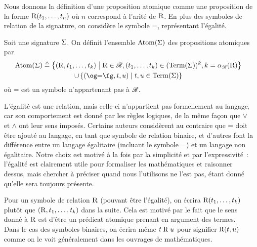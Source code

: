 Nous donnons la définition d'une proposition atomique comme une proposition de
la forme $\mathrm{R}(t_1,\ldots,t_n)$ où $n$ correspond à l'arité de $\mathrm{R}$. En
plus des symboles de relation de la signature, on considère le symbole
$\mathord{=}$, représentant l'égalité.

\begin{definition}
  Soit une signature $\Sigma$. On définit l'ensemble $\operatorname{Atom}(\Sigma)$ des
  propositions atomiques par
  \begin{multline*}
    \Atom(\Sign) \defeq \compr{(\symbR,t_1,\ldots,t_k)}{\symbR\in\SigRel,
    (t_1,\ldots,t_k) \in (\Term(\Sign))^k, k = \aritRel(\symbR)}\\
    \cup\compr{(\ogM\mathord{=}\fgM,t,u)}{t,u\in \Term(\Sign)}
  \end{multline*}
  où $\mathord{=}$ est un symbole n'appartenant pas à $\mathscr R$.
\end{definition}

\begin{remark}
  L'égalité est une relation, mais celle-ci n'appartient pas formellement au
  langage, car son comportement est donné par les règles logiques, de la même
  façon que $\lor$ et $\land$ ont leur sens imposés. Certains auteurs
  considèrent au contraire que $\mathord{=}$ doit être ajouté au langage,
  en tant que
  symbole de relation binaire, et d'autres font la différence entre un langage
  égalitaire (incluant le symbole $\mathord{=}$)
  et un langage non égalitaire. Notre choix
  est motivé à la fois par la simplicité et par l'expressivité~: l'égalité est
  clairement utile pour formaliser les mathématiques et raisonner dessus, mais
  chercher à préciser quand nous l'utilisons ne l'est pas, étant donné qu'elle
  sera toujours présente.
\end{remark}

\begin{notation}
  Pour un symbole de relation $\mathrm{R}$ (pouvant être l'égalité), on écrira
  $\mathrm{R}(t_1,\ldots,t_k)$ plutôt que
  $(\mathrm{R},t_1,\ldots,t_k)$ dans la suite. Cela est motivé par le fait
  que le sens donné à $\mathrm{R}$ est d'être un prédicat atomique prenant en
  argument des termes. Dans le cas des symboles binaires, on écrira même
  $t\mathrel{\mathrm{R}} u$ pour signifier $\mathrm{R}(t,u)$ comme on le voit
  généralement dans les ouvrages de mathématiques.
\end{notation}

